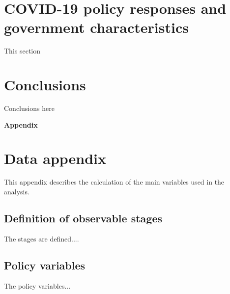 \documentclass[12pt,english]{article}
\begin{document}

\section{COVID-19 policy responses and government characteristics \label{sec:Characteristics}}


This section


\section{Conclusions\label{sec:Conclusion}}

Conclusions here

\pagebreak{}

\setlength\bibsep{0.65pt}
\setlength{\parskip}{0.1em}





\pagebreak{}



\appendix
\vphantom{}
\begin{center}
\textbf{\LARGE{}Appendix}
\par\end{center}{\LARGE \par}

\setcounter{figure}{0} \renewcommand{\thefigure}{A.\arabic{figure}}
\setcounter{table}{0} \renewcommand{\thetable}{A.\arabic{table}}


\section{Data appendix\label{sec:Figures}}
\begin{spacing}{0.40000000000000002}

This appendix describes the calculation of the main variables used in the analysis.

\subsection{Definition of observable stages}

The stages are defined....

\subsection{Policy variables}

The policy variables...



\end{spacing}
\end{document}
